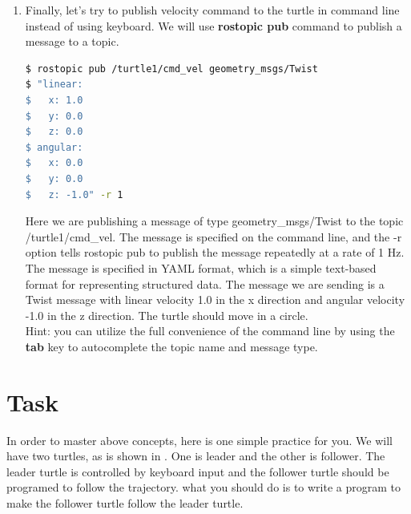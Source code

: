 \begin{enumerate}
	In this case, both linear and angular are \textbf{composite fields} whose date type is geometry\_{}msgs/Vector3. The indentation shows that fields named x, y, and z aremembers within
	those two top-level fields. That is, a message with type geometry\_{}msgs/Twist contains exactly six numbers, organized into two vectors called linear and angular. Each of these
	numbers has the built-in type float64.

	\item Finally, let's try to publish velocity command to the turtle in command line instead of using keyboard.
	We will use \textbf{rostopic pub} command to publish a message to a topic.

\begin{lstlisting}[language=bash]
$ rostopic pub /turtle1/cmd_vel geometry_msgs/Twist
$ "linear:
$   x: 1.0
$   y: 0.0
$   z: 0.0
$ angular:
$   x: 0.0
$   y: 0.0
$   z: -1.0" -r 1
\end{lstlisting}

	Here we are publishing a message of type geometry\_{}msgs/Twist to the topic /turtle1/cmd\_{}vel. The message is specified on the command line, and the -r option tells rostopic pub to
	publish the message repeatedly at a rate of 1 Hz. The message is specified in YAML format, which is a simple text-based format for representing structured data. The message we are
	sending is a Twist message with linear velocity 1.0 in the x direction and angular velocity -1.0 in the z direction. The turtle should move in a circle.\\
	Hint: you can utilize the full convenience of the command line by using the \textbf{tab} key to autocomplete the topic name and message type.\\

\end{enumerate}

\section{Task}

In order to master above concepts, here is one simple practice for you. We will have two turtles, as is shown in . One is leader and the other is follower.
The leader turtle is controlled by keyboard input and the follower turtle should be programed to follow the trajectory.
what you should do is to write a program to make the follower turtle follow the leader turtle.\\

